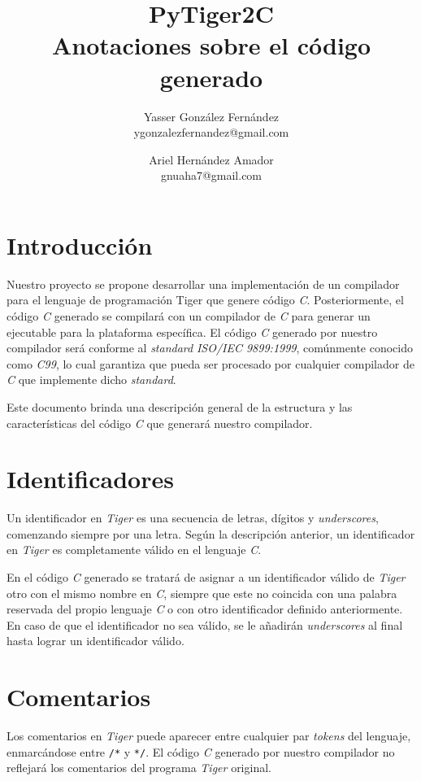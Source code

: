 \documentclass{article}
\title{
    \LARGE{PyTiger2C} \\
    \Large{Anotaciones sobre el código generado}
}
\author{
    Yasser González Fernández \\
    \small{ygonzalezfernandez@gmail.com}
    \and
    Ariel Hernández Amador \\
    \small{gnuaha7@gmail.com}
}
\date{}
\begin{document}
\maketitle

\thispagestyle{empty}

\newpage

\setcounter{page}{1}

\section{Introducción}

Nuestro proyecto se propone desarrollar una implementación de un compilador para
el lenguaje de programación Tiger que genere código \emph{C}. Posteriormente, el
código \emph{C} generado se compilará con un compilador de \emph{C} para generar
un ejecutable para la plataforma específica. El código \emph{C} generado por
nuestro compilador será conforme al \emph{standard} \emph{ISO/IEC 9899:1999},
comúnmente conocido como \emph{C99}, lo cual garantiza que pueda ser procesado
por cualquier compilador de \emph{C} que implemente dicho \emph{standard}.

Este documento brinda una descripción general de la estructura y las
características del código \emph{C} que generará nuestro compilador.

\section{Identificadores}

Un identificador en \textit{Tiger} es una secuencia de letras, dígitos y
\textit{underscores}, comenzando siempre por una letra. Según la descripción
anterior, un identificador en \textit{Tiger} es completamente válido en el
lenguaje \textit{C}.

En el código \textit{C} generado se tratará de asignar a un identificador
válido de \textit{Tiger} otro con el mismo nombre en \textit{C}, siempre que
este no coincida con una palabra reservada del propio lenguaje \textit{C} o con
otro identificador definido anteriormente. En caso de que el identificador no
sea válido, se le añadirán \textit{underscores} al final hasta lograr un
identificador válido.

\section{Comentarios}

Los comentarios en \textit{Tiger} puede aparecer entre cualquier par
\textit{tokens} del lenguaje, enmarcándose entre \texttt{/*} y \texttt{*/}. El
código \textit{C} generado por nuestro compilador no reflejará los comentarios
del programa \textit{Tiger} original.
\end{document}
